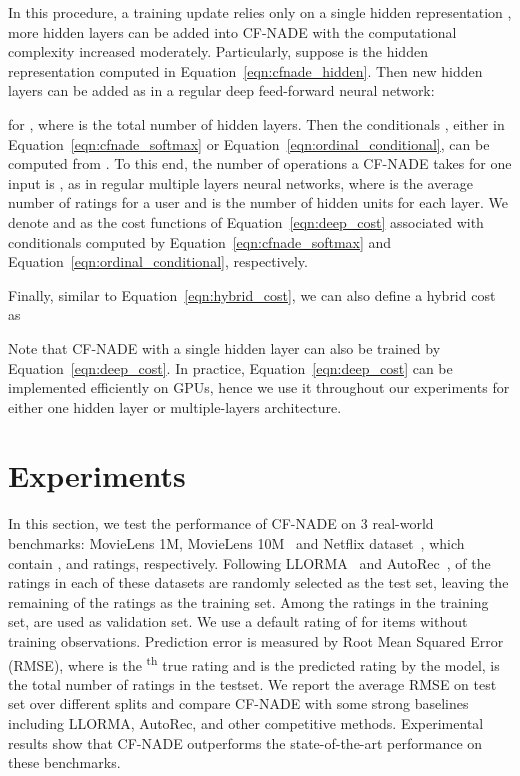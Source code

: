 \documentclass{article}
\newcommand{\cfnade}{CF-NADE\xspace}
\begin{document}
In this procedure, a training update relies only on a single hidden
representation , more hidden
layers can be added into \cfnade with the
computational complexity increased moderately. Particularly, suppose
 is the hidden
representation computed in Equation~\ref{eqn:cfnade_hidden}. Then new hidden layers can be
added as in a regular deep feed-forward neural network:

for , where  is the total number of hidden
layers. Then the conditionals
, either in
Equation~\ref{eqn:cfnade_softmax} or
Equation~\ref{eqn:ordinal_conditional}, can be computed from
. To this end, the number of
operations a \cfnade takes for one input is , as
in regular multiple layers neural networks, where  is the
average number of ratings for a user and  is the number of hidden
units for each layer.  We denote  and
 as the cost functions of
Equation~\ref{eqn:deep_cost} associated with conditionals computed by
Equation~\ref{eqn:cfnade_softmax} and
Equation~\ref{eqn:ordinal_conditional}, respectively.

Finally, similar to Equation~\ref{eqn:hybrid_cost}, we can also define a hybrid cost  as 


Note that \cfnade with a single hidden layer can also be trained by
Equation~\ref{eqn:deep_cost}. In practice,
Equation~\ref{eqn:deep_cost} can be implemented efficiently on GPUs,
hence we use it throughout our experiments for either one hidden layer
or multiple-layers architecture.







\section{Experiments}
\label{sec:experiments}

In this section, we test the performance of \cfnade on 3 real-world
benchmarks: MovieLens 1M, MovieLens 10M~\citep{harper2015movielens}
and Netflix dataset~\citep{bennett2007netflix}, which contain ,
 and  ratings, respectively. Following
LLORMA~\citep{lee2013local} and AutoRec~\citep{sedhain2015autorec},
 of the ratings in each of these datasets are randomly selected
as the test set, leaving the remaining  of the ratings as the
training set. Among the ratings in the training set,  are used as
validation set. We use a default rating of  for items without
training observations. Prediction error is measured by Root Mean
Squared Error (RMSE), 
where  is the \textsuperscript{th} true rating and
 is the predicted rating by the model,  is the total
number of ratings in the testset. We report the average RMSE on test
set over  different splits and compare \cfnade with some strong
baselines including LLORMA, AutoRec, and other competitive
methods. Experimental results show that \cfnade outperforms the
state-of-the-art performance on these benchmarks.
\end{document}

